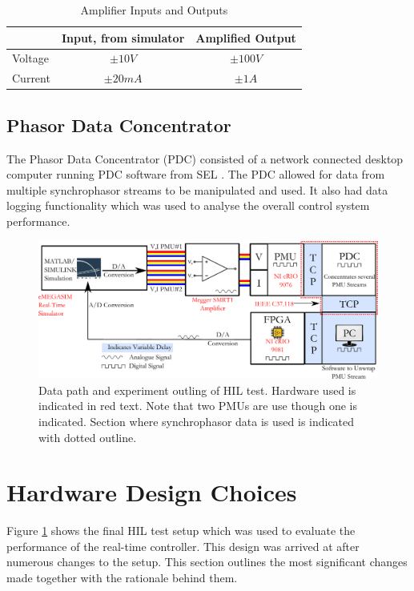 \documentclass[conference]{IEEEtran}
\begin{document}
\begin{table}[!ht]
\caption{Amplifier Inputs and Outputs}\label{AmplifierTable}
\begin{center}
\begin{tabular}{|l|c|c|}
\hline \textbf{} & \textbf{Input, from simulator} & \textbf{Amplified Output} \\
\hline Voltage &$\pm10 V$&$\pm 100 V$\\ 
\hline Current & $\pm 20 mA$ & $\pm 1 A$\\ 
\hline 
\end{tabular}
\end{center}
\end{table} 

\subsection{Phasor Data Concentrator}
The Phasor Data Concentrator (PDC) consisted of a network connected desktop computer running PDC software from SEL \cite{SEL}. The PDC allowed for data from multiple synchrophasor streams to be manipulated and used. It also had data logging functionality which was used to analyse the overall control system performance.

\begin{figure}[!th]
\centering
\includegraphics[width=6in]{DelaySources.pdf} 
\caption{Data path and experiment outling of HIL test. Hardware used is indicated in {\color{red}red} text. Note that two PMUs are use though one is indicated. Section where synchrophasor data is used is indicated with dotted outline.}
\label{ExperimentOutline}
\end{figure}

\section{Hardware Design Choices} \label{Design}
Figure \ref{ExperimentOutline} shows the final HIL test setup which was used to evaluate the performance of the real-time controller. This design was arrived at after numerous changes to the setup. This section outlines the most significant changes made together with the rationale behind them.
\end{document}
